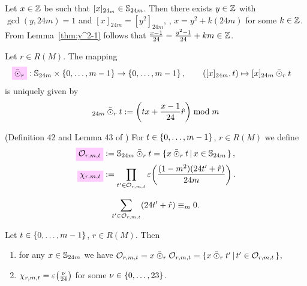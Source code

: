 \documentclass{article}
\begin{document}
Let $x \in \mathbb{Z}$ be such that $[x]_{24_m} \in \mathbb{S}_{24m}$. Then
there exists $y \in \mathbb{Z}$ with $\gcd(y, 24m)=1$ and
$[x]_{24m}=[y^2]_{24m}$, \ie, $x = y^2 + k (24m)$ for some $k\in
\mathbb{Z}$. From Lemma~\ref{thm:y^2-1} follows that
$\frac{x-1}{24}=\frac{y^2-1}{24} + km \in\mathbb{Z}$.


\begin{Definition}\cite[Def.~41]{Radu:RamanujanKolberg:2015}
  Let $r \in R(M)$.
  The mapping
  \begin{align*}
    \defineNotation[odotbar-r]{\bar{\odot}_r}
    &: \setS_{24m} \times \Set{0,\ldots,m-1} \to \Set{0,\ldots,m-1},
    \qquad
    ([x]_{24m}, t) \mapsto [x]_{24m}  \mathbin{\bar{\odot}_r} t
  \end{align*}
  is uniquely given by
  \begin{gather}
    [x]_{24m} \mathbin{\bar{\odot}_r} t
    :=
    \left( t x + \frac{x-1}{24} \sumdelta{r} \right) \bmod{m}
  \end{gather}
\end{Definition}

\begin{Definition}
  (Definition 42 and Lemma 43 of \cite{Radu:RamanujanKolberg:2015})
  For $t\in\left\{0,\ldots,m-1\right\}$, $r \in R(M)$ we define
  \begin{align}
    \defineNotation[O-r-m-t]{\modularOrbit{r,m,t}}
    &:=
      \setS_{24m}  \mathbin{\bar{\odot}_r} t
      =
      \SetDef{x \mathbin{\bar{\odot}_r} t}{x \in \setS_{24m}},
    \\
    \defineNotation[chi-r-m-t]{\chi_{r,m,t}}
    &:=
      \prod_{t' \in \modularOrbit{r,m,t}}
        \unityPower{\frac{(1-m^2)(24 t'+ \sumdelta{r})}{24 m}}.
  \end{align}
\end{Definition}

\begin{Lemma}
  \label{thm:orbit-sum}
  \cite[Lemma~43]{Radu:RamanujanKolberg:2015}
  \begin{gather}
      \sum_{t' \in \mathcal{O}_{r,m,t}} (24 t'+ \hat{r}) \equiv_m 0.
    \label{eq:orbit-rum}
  \end{gather}
\end{Lemma}

\begin{Lemma}
  \label{thm:stable-O-r-m-t}
  \label{thm:chi-exponent}
  \cite[Lemma~43]{Radu:RamanujanKolberg:2015}
  Let $t\in\left\{0,\ldots,m-1\right\}$, $r \in R(M)$. Then
  \begin{enumerate}
  \item for any $x \in \mathbb{S}_{24m}$ we have
    $\modularOrbit{r,m,t}
    = x \mathbin{\bar{\odot}_r} \modularOrbit{r,m,t}
    = \SetDef{x \mathbin{\bar{\odot}_r} t'}{t'\in \modularOrbit{r,m,t}}$,
  \item $\chi_{r,m,t}=\varepsilon\!\left(\frac{\nu}{24}\right)$ for some
    $\nu \in \left\{0,\ldots,23\right\}$.
  \end{enumerate}
\end{Lemma}
\end{document}
